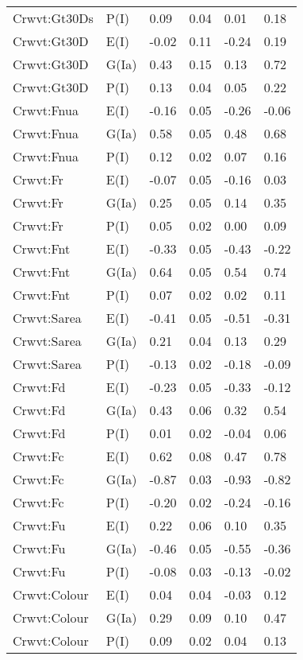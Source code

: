 \begin{center}
\begin{longtable}{|p{1.1in}|p{0.7in}|p{0.7in}|p{0.6in}|p{0.6in}|p{0.6in}|}
  Crwvt:Gt30Ds & P(I) & 0.09 & 0.04 & 0.01 & 0.18 \\ 
  Crwvt:Gt30D & E(I) & -0.02 & 0.11 & -0.24 & 0.19 \\ 
  Crwvt:Gt30D & G(Ia) & 0.43 & 0.15 & 0.13 & 0.72 \\ 
  Crwvt:Gt30D & P(I) & 0.13 & 0.04 & 0.05 & 0.22 \\ 
  Crwvt:Fnua & E(I) & -0.16 & 0.05 & -0.26 & -0.06 \\ 
  Crwvt:Fnua & G(Ia) & 0.58 & 0.05 & 0.48 & 0.68 \\ 
  Crwvt:Fnua & P(I) & 0.12 & 0.02 & 0.07 & 0.16 \\ 
  Crwvt:Fr & E(I) & -0.07 & 0.05 & -0.16 & 0.03 \\ 
  Crwvt:Fr & G(Ia) & 0.25 & 0.05 & 0.14 & 0.35 \\ 
  Crwvt:Fr & P(I) & 0.05 & 0.02 & 0.00 & 0.09 \\ 
  Crwvt:Fnt & E(I) & -0.33 & 0.05 & -0.43 & -0.22 \\ 
  Crwvt:Fnt & G(Ia) & 0.64 & 0.05 & 0.54 & 0.74 \\ 
  Crwvt:Fnt & P(I) & 0.07 & 0.02 & 0.02 & 0.11 \\ 
  Crwvt:Sarea & E(I) & -0.41 & 0.05 & -0.51 & -0.31 \\ 
  Crwvt:Sarea & G(Ia) & 0.21 & 0.04 & 0.13 & 0.29 \\ 
  Crwvt:Sarea & P(I) & -0.13 & 0.02 & -0.18 & -0.09 \\ 
  Crwvt:Fd & E(I) & -0.23 & 0.05 & -0.33 & -0.12 \\ 
  Crwvt:Fd & G(Ia) & 0.43 & 0.06 & 0.32 & 0.54 \\ 
  Crwvt:Fd & P(I) & 0.01 & 0.02 & -0.04 & 0.06 \\ 
  Crwvt:Fc & E(I) & 0.62 & 0.08 & 0.47 & 0.78 \\ 
  Crwvt:Fc & G(Ia) & -0.87 & 0.03 & -0.93 & -0.82 \\ 
  Crwvt:Fc & P(I) & -0.20 & 0.02 & -0.24 & -0.16 \\ 
  Crwvt:Fu & E(I) & 0.22 & 0.06 & 0.10 & 0.35 \\ 
  Crwvt:Fu & G(Ia) & -0.46 & 0.05 & -0.55 & -0.36 \\ 
  Crwvt:Fu & P(I) & -0.08 & 0.03 & -0.13 & -0.02 \\ 
  Crwvt:Colour & E(I) & 0.04 & 0.04 & -0.03 & 0.12 \\ 
  Crwvt:Colour & G(Ia) & 0.29 & 0.09 & 0.10 & 0.47 \\ 
  Crwvt:Colour & P(I) & 0.09 & 0.02 & 0.04 & 0.13 \\ 

\end{longtable}
\end{center}
